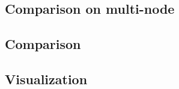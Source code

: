 \subsection{Comparison on multi-node}
\subsection{Comparison}





\subsection{Visualization}













